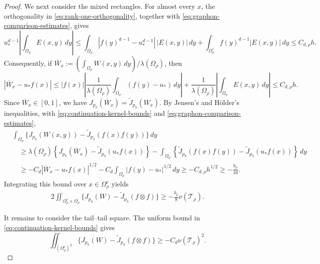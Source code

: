 \begin{proof}
We next consider the mixed rectangles.  For almost every $x$, the
orthogonality in
\eqref{eq:rank-one-orthogonality}, together with
\eqref{eq:graphon-comparison-estimates}, gives
\begin{equation*}
  u_*^{d-1}\left|\int_{\Omega_\rho}E(x,y)\,dy\right|
  \le\int_{\Omega_\rho}
    |f(y)^{d-1}-u_*^{d-1}|\,|E(x,y)|\,dy
  +\int_{\Omega_\rho^c}f(y)^{d-1}|E(x,y)|\,dy
  \le C_{d,\rho}h.
\end{equation*}
Consequently, if $\overline W_x:= (\int_{\Omega_\rho}W(x,y)\,dy)/\lambda(\Omega_\rho)$,
then
\begin{equation*}
  |\overline W_x-u_*f(x)|
  \le |f(x)|\left|
    \frac1{\lambda(\Omega_\rho)}\int_{\Omega_\rho} (f(y)-u_*)\,dy\right|
    +\frac1{\lambda(\Omega_\rho)}\left|\int_{\Omega_\rho}E(x,y)\,dy\right|
  \le C_{d,\rho}h.
\end{equation*}
Since $\overline W_x\in[0,1]$, we have
$J_{p_h}(\overline W_x)=\widetilde J_{p_h}(\overline W_x)$.
By Jensen's and H\"older's inequalities, with
\eqref{eq:continuation-kernel-bounds} and
\eqref{eq:graphon-comparison-estimates},
\begin{equation*}
\begin{aligned}
&\int_{\Omega_\rho}
  \{J_{p_h}(W(x,y))-\widetilde J_{p_h}(f(x)f(y))\}\,dy\\
&\quad\ge \lambda(\Omega_\rho) \left\{J_{p_h}(\overline W_x)-\widetilde J_{p_h}(u_*f(x))\right\}
-\int_{\Omega_\rho} \left\{\widetilde J_{p_h}(f(x)f(y))-\widetilde J_{p_h}(u_*f(x))\right\}\,dy\\
&\quad\ge-C_d |\overline W_x - u_*f(x)|^{1/2} -C_d\int_{\Omega_\rho}|f(y)-u_*|^{1/2}\,dy \ge-C_{d,\rho}h^{1/2} \ge -\frac{b_\rho}{16}.
\end{aligned}
\end{equation*}
Integrating this bound over $x\in\Omega_\rho^c$ yields
\begin{equation*}
\begin{aligned}
  2\iint_{\Omega_\rho^c\times \Omega_\rho}
  \{J_{p_h}(W)-\widetilde J_{p_h}(f\otimes f)\}
  \ge -\frac{b_\rho}{8}\nu(\mathcal T_\rho).
\end{aligned}
\end{equation*}

It remains to consider the tail--tail square.  The uniform bound in
\eqref{eq:continuation-kernel-bounds} gives
\[
  \iint_{(\Omega_\rho^c)^2}
  \{J_{p_h}(W)-\widetilde J_{p_h}(f\otimes f)\}
  \ge-C_d\nu(\mathcal T_\rho)^2.
\]


\end{proof}
